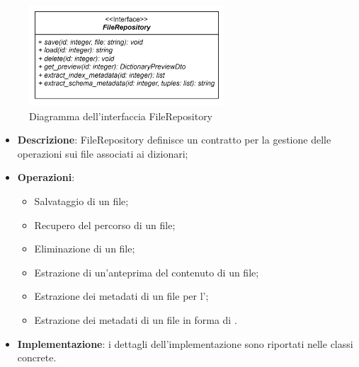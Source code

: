  \label{FileRepository}
\begin{figure}[H]
    \centering
    \includegraphics[width=0.65\textwidth]{assets/Backend/file_repository.png}
    \caption{Diagramma dell'interfaccia FileRepository}
  \end{figure}
\begin{itemize}
  \item \textbf{Descrizione}: FileRepository definisce un contratto per la gestione delle operazioni  sui file associati ai dizionari;
  \item \textbf{Operazioni}: 
    \begin{itemize}
      \item Salvataggio di un file;
      \item Recupero del percorso di un file;
      \item Eliminazione di un file;
      \item Estrazione di un'anteprima del contenuto di un file;
      \item Estrazione dei metadati di un file per l';
      \item Estrazione dei metadati di un file in forma di .
    \end{itemize}
  \item \textbf{Implementazione}: i dettagli dell'implementazione sono riportati nelle classi concrete.
\end{itemize} 
